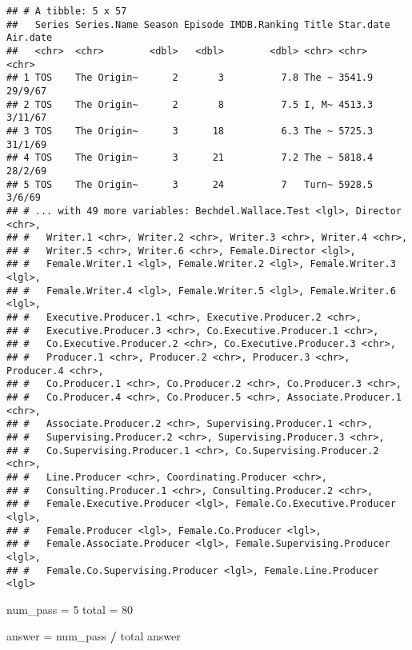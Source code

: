 \documentclass[
]{article}
\newenvironment{Shaded}{\begin{snugshade}}{\end{snugshade}}
\newcommand{\DecValTok}[1]{\textcolor[rgb]{0.00,0.00,0.81}{#1}}
\newcommand{\NormalTok}[1]{#1}
\newcommand{\OperatorTok}[1]{\textcolor[rgb]{0.81,0.36,0.00}{\textbf{#1}}}
\newcommand{\StringTok}[1]{\textcolor[rgb]{0.31,0.60,0.02}{#1}}
\begin{document}
\begin{verbatim}
## # A tibble: 5 x 57
##   Series Series.Name Season Episode IMDB.Ranking Title Star.date Air.date
##   <chr>  <chr>        <dbl>   <dbl>        <dbl> <chr> <chr>     <chr>   
## 1 TOS    The Origin~      2       3          7.8 The ~ 3541.9    29/9/67 
## 2 TOS    The Origin~      2       8          7.5 I, M~ 4513.3    3/11/67 
## 3 TOS    The Origin~      3      18          6.3 The ~ 5725.3    31/1/69 
## 4 TOS    The Origin~      3      21          7.2 The ~ 5818.4    28/2/69 
## 5 TOS    The Origin~      3      24          7   Turn~ 5928.5    3/6/69  
## # ... with 49 more variables: Bechdel.Wallace.Test <lgl>, Director <chr>,
## #   Writer.1 <chr>, Writer.2 <chr>, Writer.3 <chr>, Writer.4 <chr>,
## #   Writer.5 <chr>, Writer.6 <chr>, Female.Director <lgl>,
## #   Female.Writer.1 <lgl>, Female.Writer.2 <lgl>, Female.Writer.3 <lgl>,
## #   Female.Writer.4 <lgl>, Female.Writer.5 <lgl>, Female.Writer.6 <lgl>,
## #   Executive.Producer.1 <chr>, Executive.Producer.2 <chr>,
## #   Executive.Producer.3 <chr>, Co.Executive.Producer.1 <chr>,
## #   Co.Executive.Producer.2 <chr>, Co.Executive.Producer.3 <chr>,
## #   Producer.1 <chr>, Producer.2 <chr>, Producer.3 <chr>, Producer.4 <chr>,
## #   Co.Producer.1 <chr>, Co.Producer.2 <chr>, Co.Producer.3 <chr>,
## #   Co.Producer.4 <chr>, Co.Producer.5 <chr>, Associate.Producer.1 <chr>,
## #   Associate.Producer.2 <chr>, Supervising.Producer.1 <chr>,
## #   Supervising.Producer.2 <chr>, Supervising.Producer.3 <chr>,
## #   Co.Supervising.Producer.1 <chr>, Co.Supervising.Producer.2 <chr>,
## #   Line.Producer <chr>, Coordinating.Producer <chr>,
## #   Consulting.Producer.1 <chr>, Consulting.Producer.2 <chr>,
## #   Female.Executive.Producer <lgl>, Female.Co.Executive.Producer <lgl>,
## #   Female.Producer <lgl>, Female.Co.Producer <lgl>,
## #   Female.Associate.Producer <lgl>, Female.Supervising.Producer <lgl>,
## #   Female.Co.Supervising.Producer <lgl>, Female.Line.Producer <lgl>
\end{verbatim}

\begin{Shaded}
\begin{Highlighting}[]
\NormalTok{num_pass =}\StringTok{ }\DecValTok{5}
\NormalTok{total =}\StringTok{ }\DecValTok{80}

\NormalTok{answer =}\StringTok{ }\NormalTok{num_pass }\OperatorTok{/}\StringTok{ }\NormalTok{total}
\NormalTok{answer}
\end{Highlighting}
\end{Shaded}
\end{document}
